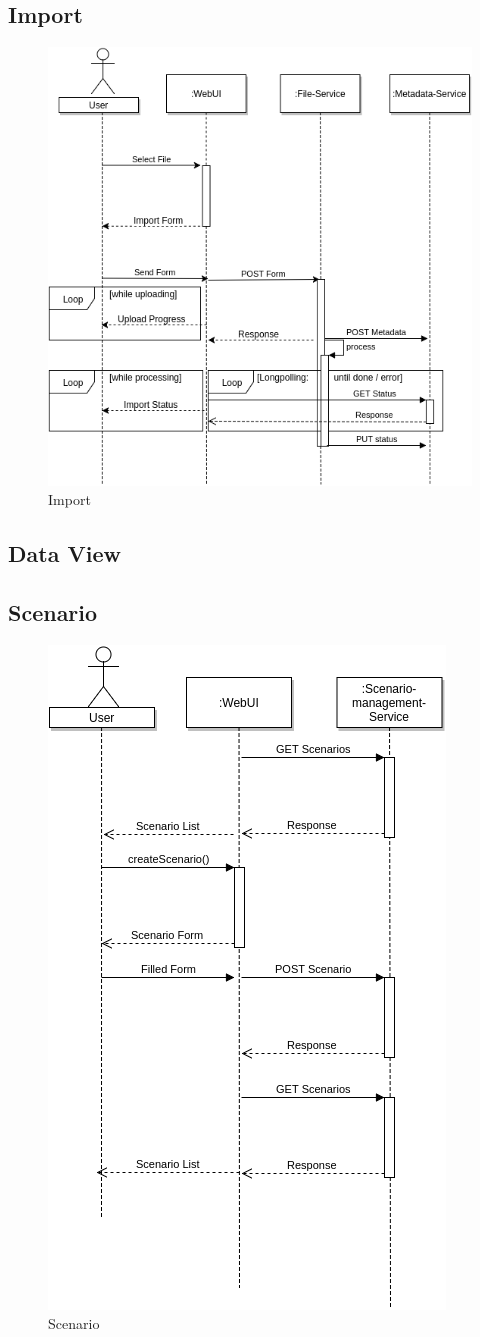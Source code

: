 \subsection{Import}
\begin{figure}[H]
	\centering\includegraphics[width=.75\textwidth]{res/Import}
	\caption{Import}
	\label{fig:import}
\end{figure}

\subsection{Data View}

\subsection{Scenario}
\begin{figure}[H]
	\centering\includegraphics[width=.65\textwidth]{res/Scenario}
	\caption{Scenario}
	\label{fig:scenario}
\end{figure}


